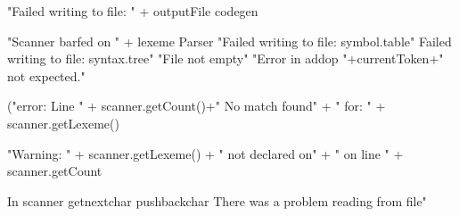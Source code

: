 "Failed writing to file: " + outputFile  codegen

"Scanner barfed on " + lexeme  Parser
"Failed writing to file: symbol.table"
Failed writing to file: syntax.tree"
"File not empty"
"Error in addop "+currentToken+" not expected."

("error: Line " + scanner.getCount()+" No match found"
+ " for: " + scanner.getLexeme() 

"Warning: " + scanner.getLexeme() + " not declared on"
+ " on line " + scanner.getCount

In scanner getnextchar pushbackchar
There was a problem reading from file"